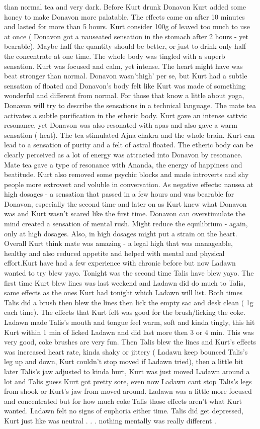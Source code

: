 \documentclass[12pt]{book}
\begin{document}
than normal tea and very dark. Before Kurt drunk Donavon Kurt added some honey to make Donavon more palatable. The effects came on after 10 minutes and lasted for more than 5 hours. Kurt consider 100g of leaved too much to use at once ( Donavon got a nauseated sensation in the stomach after 2 hours - yet bearable). Maybe half the quantity should be better, or just to drink only half the concentrate at one time. The whole body was tingled with a superb sensation. Kurt was focused and calm, yet intense. The heart might have was beat stronger than normal. Donavon wasn'thigh' per se, but Kurt had a subtle sensation of floated and Donavon's body felt like Kurt was made of something wonderful and different from normal. For those that know a little about yoga, Donavon will try to describe the sensations in a technical language. The mate tea activates a subtle purification in the etheric body. Kurt gave an intense sattvic resonance, yet Donavon was also resonated with apas and also gave a warm sensation ( heat). The tea stimulated Ajna chakra and the whole brain. Kurt can lead to a sensation of purity and a felt of astral floated. The etheric body can be clearly perceived as a lot of energy was attracted into Donavon by resonance. Mate tea gave a type of resonance with Ananda, the energy of happiness and beatitude. Kurt also removed some psychic blocks and made introverts and shy people more extrovert and voluble in conversation. As negative effects: nausea at high dosages - a sensation that passed in a few hours and was bearable for Donavon, especially the second time and later on as Kurt knew what Donavon was and Kurt wasn't scared like the first time. Donavon can overstimulate the mind created a sensation of mental rush. Might reduce the equilibrium - again, only at high dosages. Also, in high dosages might put a strain on the heart. Overall Kurt think mate was amazing - a legal high that was manageable, healthy and also reduced appetite and helped with mental and physical effort.Kurt have had a few experience with chronic before but now Ladawn wanted to try blew yayo. Tonight was the second time Talis have blew yayo. The first time Kurt blew lines was last weekend and Ladawn did do much to Talis, same effects as the ones Kurt had tonight which Ladawn will list. Both times Talis did a brush then blew the lines then lick the empty sac and desk clean ( 1g each time). The effects that Kurt felt was good for the brush/licking the coke. Ladawn made Talis's mouth and tongue feel warm, soft and kinda tingly, this hit Kurt within 1 min of licked Ladawn and did last more then 3 or 4 min. This was very good, coke brushes are very fun. Then Talis blew the lines and Kurt's effects was increased heart rate, kinda shaky or jittery ( Ladawn keep bounced Talis's leg up and down, Kurt couldn't stop moved if Ladawn tried), then a little bit later Talis's jaw adjusted to kinda hurt, Kurt was just moved Ladawn around a lot and Talis guess Kurt got pretty sore, even now Ladawn cant stop Talis's legs from shook or Kurt's jaw from moved around. Ladawn was a little more focused and concentrated but for how much coke Talis those effects aren't what Kurt wanted. Ladawn felt no signs of euphoria either time. Talis did get depressed, Kurt just like was neutral . . .  nothing mentally was really different . 
\end{document}
